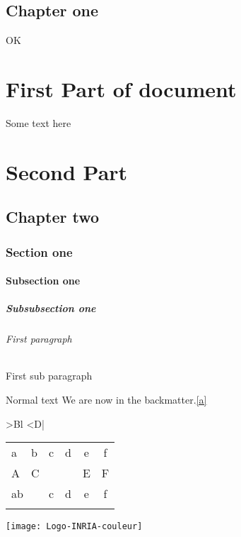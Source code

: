 \documentclass{book}
\begin{document}


\frontmatter
\chapter{Chapter one}  OK
\mainmatter
\part{First Part of document}
Some text here
\part{Second Part}
\chapter{Chapter two}
\section{Section one}
\subsection{Subsection one}
\subsubsection{Subsubsection one}
\paragraph{First paragraph}
\subparagraph{First sub paragraph}
Normal text\label{a}
\backmatter
We are now in the backmatter.\ref{a}\pageref{a}

\newcolumntype{+} {>{B}l <{D}|}

\begin{tabular*}{3cm}[t]{|ll|rr|cc|}
\hline a&b&c&d&e&f\\
A&\multicolumn{3}{+}{C}&E&F\\
\multicolumn{2}{|l}{ab}&c&d&e&f\\[1cm]
\cline{1-3}\cline{6-6}\\\hline
\end{tabular*}

\def\IC#1{\texttt{[image: Logo-INRIA-couleur]}}
\IC{1}
\fbox{\texttt{[image: A]}}
\end{document}
